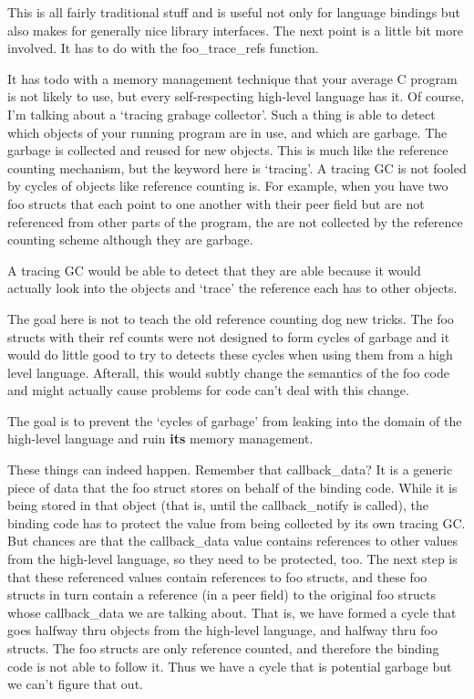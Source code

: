\documentclass{article}
\begin{document}
This is all fairly traditional stuff and is useful not only for
language bindings but also makes for generally nice library
interfaces.  The next point is a little bit more involved.  It has to
do with the foo\_trace\_refs function.

It has todo with a memory management technique that your average C
program is not likely to use, but every self-respecting high-level
language has it.  Of course, I'm talking about a `tracing grabage
collector'.  Such a thing is able to detect which objects of your
running program are in use, and which are garbage.  The garbage is
collected and reused for new objects.  This is much like the reference
counting mechanism, but the keyword here is `tracing'.  A tracing GC
is not fooled by cycles of objects like reference counting is.  For
example, when you have two foo structs that each point to one another
with their peer field but are not referenced from other parts of the
program, the are not collected by the reference counting scheme
although they are garbage.

A tracing GC would be able to detect that they are able because it
would actually look into the objects and `trace' the reference each
has to other objects.

The goal here is not to teach the old reference counting dog new
tricks.  The foo structs with their ref counts were not designed to
form cycles of garbage and it would do little good to try to detects
these cycles when using them from a high level language.  Afterall,
this would subtly change the semantics of the foo code and might
actually cause problems for code can't deal with this change.

The goal is to prevent the `cycles of garbage' from leaking into the
domain of the high-level language and ruin \textbf{its} memory
management.

These things can indeed happen.  Remember that callback\_data?  It is
a generic piece of data that the foo struct stores on behalf of the
binding code.  While it is being stored in that object (that is, until
the callback\_notify is called), the binding code has to protect the
value from being collected by its own tracing GC.  But chances are
that the callback\_data value contains references to other values from
the high-level language, so they need to be protected, too.  The next
step is that these referenced values contain references to foo
structs, and these foo structs in turn contain a reference (in a peer
field) to the original foo structs whose callback\_data we are talking
about.  That is, we have formed a cycle that goes halfway thru objects
from the high-level language, and halfway thru foo structs.  The foo
structs are only reference counted, and therefore the binding code is
not able to follow it.  Thus we have a cycle that is potential garbage
but we can't figure that out.
\end{document}
